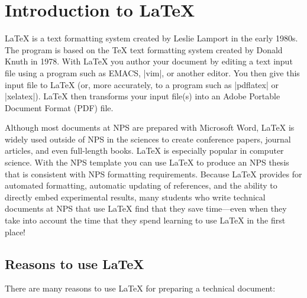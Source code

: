 \chapter{Introduction to \LaTeX}
\LaTeX{} is a text formatting system created by Leslie Lamport in the early 1980s\cite{latex}. The program is based on the \TeX{} text formatting system created by Donald Knuth in 1978\cite{tex}. With 
\LaTeX{} you author your document by editing a text input file using a
program such as EMACS, |vim|, or another editor. You then give
this input file to \LaTeX{} (or, more accurately, to a program such as
|pdflatex| or |xelatex|). \LaTeX{} then transforms your
input file(s) into an Adobe Portable Document Format (PDF) file.

Although most documents at NPS are prepared with
Microsoft\textregistered{} Word, \LaTeX{} is widely used outside of
NPS in the sciences to create conference papers, journal articles, and
even full-length books. \LaTeX{} is especially popular in computer
science. With the NPS template you can use \LaTeX{} to produce an NPS
thesis that is consistent with NPS formatting requirements. Because
\LaTeX{} provides for automated formatting, automatic updating of
references, and the ability to directly embed experimental results,
many students who write technical documents at NPS that use \LaTeX{}
find that they save time---even when they take into account the time
that they spend learning to use \LaTeX{} in the first place!

\section{Reasons to use \LaTeX}
There are many reasons to use \LaTeX{} for preparing
a technical document:


